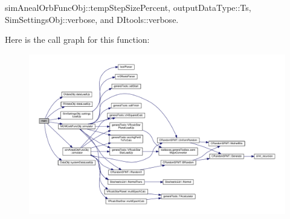 sim\-Aneal\-Orb\-Func\-Obj\-::temp\-Step\-Size\-Percent, output\-Data\-Type\-::\-Ts, Sim\-Settings\-Obj\-::verbose, and D\-Itools\-::verbose.



Here is the call graph for this function\-:\nopagebreak
\begin{figure}[H]
\begin{center}
\leavevmode
\includegraphics[width=350pt]{looped___m_c_m_corb_simulator1_8cpp_a0ddf1224851353fc92bfbff6f499fa97_cgraph}
\end{center}
\end{figure}


